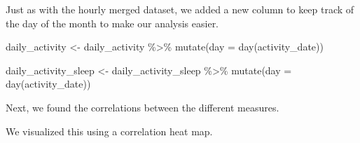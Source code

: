 \documentclass[
]{article}
\newenvironment{Shaded}{\begin{snugshade}}{\end{snugshade}}
\newcommand{\AttributeTok}[1]{\textcolor[rgb]{0.77,0.63,0.00}{#1}}
\newcommand{\FunctionTok}[1]{\textcolor[rgb]{0.00,0.00,0.00}{#1}}
\newcommand{\NormalTok}[1]{#1}
\newcommand{\OtherTok}[1]{\textcolor[rgb]{0.56,0.35,0.01}{#1}}
\newcommand{\SpecialCharTok}[1]{\textcolor[rgb]{0.00,0.00,0.00}{#1}}
\begin{document}
Just as with the hourly merged dataset, we added a new column to keep
track of the day of the month to make our analysis easier.

\begin{Shaded}
\begin{Highlighting}[]
\NormalTok{daily\_activity }\OtherTok{\textless{}{-}}\NormalTok{ daily\_activity }\SpecialCharTok{\%\textgreater{}\%}
  \FunctionTok{mutate}\NormalTok{(}\AttributeTok{day =} \FunctionTok{day}\NormalTok{(activity\_date))}

\NormalTok{daily\_activity\_sleep }\OtherTok{\textless{}{-}}\NormalTok{ daily\_activity\_sleep }\SpecialCharTok{\%\textgreater{}\%}
  \FunctionTok{mutate}\NormalTok{(}\AttributeTok{day =} \FunctionTok{day}\NormalTok{(activity\_date))}
\end{Highlighting}
\end{Shaded}

Next, we found the correlations between the different measures.

We visualized this using a correlation heat map.
\end{document}
